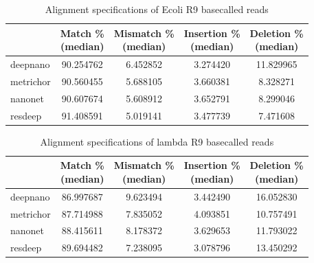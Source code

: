\documentclass[times, utf8, diplomski, numeric, english]{fer}
\begin{document}
\begin{table}[htb]
	\caption{Alignment specifications of Ecoli R9 basecalled reads}
	\label{tbl:spec}
	\centering
	\begin{tabular}{lcccc}
		\toprule
		{} &  \thead{Match \% \\(median)} &  \thead{Mismatch \% \\(median)} &  \thead{Insertion \% \\(median)} &  \thead{Deletion \% \\(median)} \\
		\midrule
		
		deepnano   &                  90.254762 &                      6.452852 &                       3.274420 &                     11.829965 \\
		metrichor  &                  90.560455 &                      5.688105 &                       3.660381 &                      8.328271 \\
		nanonet    &                  90.607674 &                      5.608912 &                       3.652791 &                      8.299046 \\
		resdeep    &                  91.408591 &                      5.019141 &                       3.477739 &                      7.471608 \\
		\bottomrule
	\end{tabular}
\end{table}

\begin{table}[htb]
	\caption{Alignment specifications of lambda R9 basecalled reads}
	\label{tbl:spec}
	\centering
\begin{tabular}{lcccc}
	\toprule
	{} &  \thead{Match \% \\(median)} &  \thead{Mismatch \% \\(median)} &  \thead{Insertion \% \\(median)} &  \thead{Deletion \% \\(median)} \\
	\midrule
	deepnano   &                  86.997687 &                      9.623494 &                       3.442490 &                     16.052830 \\
	metrichor  &                  87.714988 &                      7.835052 &                       4.093851 &                     10.757491 \\
	nanonet    &                  88.415611 &                      8.178372 &                       3.629653 &                     11.793022 \\
	resdeep    &                  89.694482 &                      7.238095 &                       3.078796 &                     13.450292 \\
	\bottomrule
\end{tabular}
\end{table}
\end{document}
